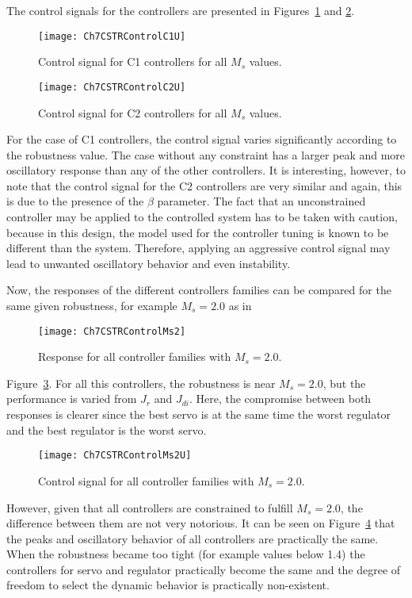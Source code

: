 The control signals for the controllers are presented in Figures~\ref{fig:Ch7CSTRControlC1U} and \ref{fig:Ch7CSTRControlC2U}. %
\begin{figure}[tb]
	\centering
	\texttt{[image: Ch7CSTRControlC1U]}
	\caption{Control signal for C1 controllers for all $M_s$ values.}
	\label{fig:Ch7CSTRControlC1U}
\end{figure}
%
\begin{figure}[tb]
	\centering
	\texttt{[image: Ch7CSTRControlC2U]}
	\caption{Control signal for C2 controllers for all $M_s$ values.}
	\label{fig:Ch7CSTRControlC2U}
\end{figure}
%
For the case of C1 controllers, the control signal varies significantly according to the robustness value. The case without any constraint has a larger peak and more oscillatory response than any of the other controllers. It is interesting, however, to note that the control signal for the C2 controllers are very similar and again, this is due to the presence of the $\beta$ parameter. The fact that an unconstrained controller may be applied to the controlled system has to be taken with caution, because in this design, the model used for the controller tuning is known to be different than the system. Therefore, applying an aggressive control signal may lead to unwanted oscillatory behavior and even instability.

Now, the responses of the different controllers families can be compared for the same given robustness, for example $M_s = 2.0$ as in %
\begin{figure}[tb]
	\centering
	\texttt{[image: Ch7CSTRControlMs2]}
	\caption{Response for all controller families with $M_s = 2.0$.}
	\label{fig:Ch7CSTRControlMs2}
\end{figure}
%
Figure~\ref{fig:Ch7CSTRControlMs2}. For all this controllers, the robustness is near $M_s = 2.0$, but the performance is varied from $J_r$ and $J_{di}$. Here, the compromise between both responses is clearer since the best servo is at the same time the worst regulator and the best regulator is the worst servo.
%
\begin{figure}[tb]
	\centering
	\texttt{[image: Ch7CSTRControlMs2U]}
	\caption{Control signal for all controller families with $M_s = 2.0$.}
	\label{fig:Ch7CSTRControlMs2U}
\end{figure}
%

However, given that all controllers are constrained to fulfill $M_s = 2.0$, the difference between them are not very notorious. It can be seen on Figure~\ref{fig:Ch7CSTRControlMs2U} that the peaks and oscillatory behavior of all controllers are practically the same. When the robustness became too tight (for example values below 1.4) the controllers for servo and regulator practically become the same and the degree of freedom to select the dynamic behavior is practically non-existent.

